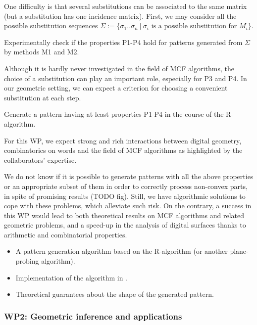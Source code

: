 One difficulty is that several substitutions can be associated to the same matrix
(but a substitution has one incidence matrix). First, we may consider all the possible
substitution sequences
$\Sigma := \{ \sigma_1..\sigma_n \ | \ \sigma_i \text{ is a possible substitution for } M_i \}$.

\begin{Task}
  \label{task:genexp}
  Experimentally check if the properties P1-P4 hold for patterns generated from $\Sigma$
  by methods M1 and M2.  
\end{Task}

Although it is hardly never investigated in the field of MCF algorithms, the choice of a
substitution can play an important role, especially for P3 and P4. In our geometric setting,
we can expect a criterion for choosing a convenient substitution at each step. 

\begin{Task}
  \label{task:genpat}
  Generate a pattern having at least properties P1-P4 in the course of the R-algorithm. 
\end{Task}

For this WP, we expect strong and rich interactions between digital geometry, combinatorics on words
and the field of MCF algorithms as highlighted by the collaborators' expertise.

\Risks
We do not know if it is possible to generate patterns with all the above properties
or an appropriate subset of them in order to correctly process non-convex parts,
in spite of promising results (TODO fig). Still, we have algorithmic solutions
\cite{LPRJMIV2017} to cope with these problems, which alleviate such risk. 
On the contrary, a success in this WP would lead to both theoretical results
on MCF algorithms and related geometric problems, and a speed-up in the analysis
of digital surfaces thanks to arithmetic and combinatorial properties.  

\Success
\begin{itemize}
  \item A pattern generation algorithm based on the R-algorithm (or another plane-probing algorithm).
  \item Implementation of the algorithm in \DGtal.
  \item Theoretical guarantees about the shape of the generated pattern. 
\end{itemize}


\subsubsection{WP2: Geometric inference and applications}
\label{wpEstim}

